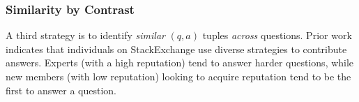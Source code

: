 


\subsubsection{Similarity by Contrast}
\label{sub:Similar}
A third strategy is to identify \textit{similar} $(q,a)$ tuples \textit{across} questions. Prior work~\cite{Wu2016} indicates that individuals on StackExchange use diverse strategies to contribute answers. Experts (with a high reputation) tend to answer harder questions, while new members (with low reputation)  looking to acquire reputation tend to be the first to answer a question.

